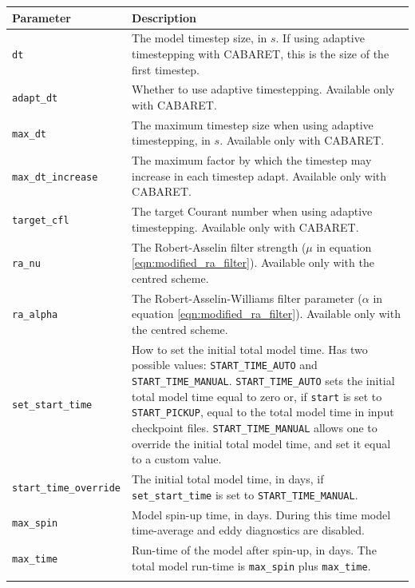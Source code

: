 \documentclass[a4paper]{book}
\begin{document}
\begin{longtable}{ | p{} | p{} | }
  \hline
  Parameter & Description \\
  \hline
  \endhead
  \verb+dt+              & The model timestep size, in $s$. If using adaptive
                           timestepping with CABARET, this is the size of the
                           first timestep. \\
  \verb+adapt_dt+        & Whether to use adaptive timestepping. Available only
                           with CABARET. \\
  \verb+max_dt+          & The maximum timestep size when using adaptive
                           timestepping, in $s$. Available only with CABARET. \\
  \verb+max_dt_increase+ & The maximum factor by which the timestep may increase
                           in each timestep adapt. Available only with
                           CABARET. \\
  \verb+target_cfl+      & The target Courant number when using adaptive
                           timestepping. Available only with CABARET. \\
  \verb+ra_nu+           & The Robert-Asselin filter strength ($\mu$ in equation
                           \eqref{eqn:modified_ra_filter}). Available only with
                           the centred scheme. \\
  \verb+ra_alpha+        & The Robert-Asselin-Williams filter parameter
                           ($\alpha$ in equation
                           \eqref{eqn:modified_ra_filter}). Available only with
                           the centred scheme. \\
  \verb+set_start_time+  & How to set the initial total model time. Has two
                           possible values: \verb+START_TIME_AUTO+ and
                           \verb+START_TIME_MANUAL+. \verb+START_TIME_AUTO+ sets
                           the initial total model time equal to zero or, if
                           \verb+start+ is set to \verb+START_PICKUP+, equal
                           to the total model time in input checkpoint files.
                           \verb+START_TIME_MANUAL+ allows one to override the
                           initial total model time, and set it equal to a
                           custom value. \\
  \verb+start_time_override+ & The initial total model time, in days, if
                               \verb+set_start_time+ is set to
                               \verb+START_TIME_MANUAL+. \\
  \verb+max_spin+        & Model spin-up time, in days. During this time model
                           time-average and eddy diagnostics are disabled. \\
  \verb+max_time+        & Run-time of the model after spin-up, in days. The
                           total model run-time is \verb+max_spin+ plus
                           \verb+max_time+. \\

  \hline
  \endfoot
\end{longtable}
\end{document}
